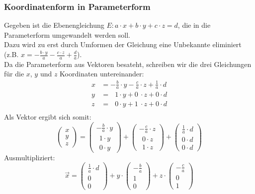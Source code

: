 \documentclass[a4paper,12pt]{article}
\begin{document}
\subsubsection{Koordinatenform in Parameterform}
Gegeben ist die Ebenengleichung $E : a \cdot x + b \cdot y + c \cdot z = d$, die in die Parameterform umgewandelt werden soll.\\
Dazu wird zu erst durch Umformen der Gleichung eine Unbekannte eliminiert (z.B. $x = -\frac{b \cdot y}{a} - \frac{c \cdot z}{a} + \frac{d}{a}$).\\
Da die Parameterform aus Vektoren besateht, schreiben wir die drei Gleichungen für die $x$, $y$ und $z$ Koordinaten untereinander:\\
\begin{equation}
\begin{split}
x & = -\frac{b}{a} \cdot y - \frac{c}{a} \cdot z + \frac{1}{a} \cdot d\\
y & = \ \ \ 1 \cdot y + 0\ \cdot z + 0 \cdot d\\
z & = \ \ \ 0 \cdot y + 1\ \cdot z + 0 \cdot d\\
\end{split}
\end{equation}
Als Vektor ergibt sich somit:
$$\begin{pmatrix}x\\y\\z\end{pmatrix} = \begin{pmatrix}-\frac{b}{a} \cdot y\\\ \ 1 \cdot y\\\ \ 0 \cdot y\end{pmatrix} + \begin{pmatrix}- \frac{c}{a}\cdot z\\\ \ 0 \cdot z\\\ \ 1 \cdot z\end{pmatrix} + \begin{pmatrix}\frac{1}{a} \cdot d\\0 \cdot d\\0 \cdot d\end{pmatrix}$$
Ausmultipliziert:
$$\vec{x} = \begin{pmatrix}\frac{1}{a} \cdot d\\0\\0\end{pmatrix} + y \cdot \begin{pmatrix}-\frac{b}{a}\\1\\0\end{pmatrix} + z \cdot \begin{pmatrix}- \frac{c}{a}\\0\\1\end{pmatrix}$$ 
\pagebreak
\end{document}
